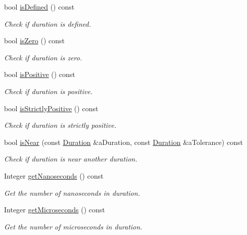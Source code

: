 \begin{DoxyCompactItemize}
bool \hyperlink{classlibrary_1_1physics_1_1time_1_1_duration_af6ee4c1644a1cafc96d670e576dc6749}{is\+Defined} () const
\begin{DoxyCompactList}\small\item\em Check if duration is defined. \end{DoxyCompactList}\item 
bool \hyperlink{classlibrary_1_1physics_1_1time_1_1_duration_a7f14980ea22f7e9cad122f7a37ba50be}{is\+Zero} () const
\begin{DoxyCompactList}\small\item\em Check if duration is zero. \end{DoxyCompactList}\item 
bool \hyperlink{classlibrary_1_1physics_1_1time_1_1_duration_a443d719fb2acf922cc80a8f2be441fa1}{is\+Positive} () const
\begin{DoxyCompactList}\small\item\em Check if duration is positive. \end{DoxyCompactList}\item 
bool \hyperlink{classlibrary_1_1physics_1_1time_1_1_duration_a2d4f7691e997232d4d9b88e7d4ab49d7}{is\+Strictly\+Positive} () const
\begin{DoxyCompactList}\small\item\em Check if duration is strictly positive. \end{DoxyCompactList}\item 
bool \hyperlink{classlibrary_1_1physics_1_1time_1_1_duration_a7df03d520e9372f58c37309e8ac8e08d}{is\+Near} (const \hyperlink{classlibrary_1_1physics_1_1time_1_1_duration}{Duration} \&a\+Duration, const \hyperlink{classlibrary_1_1physics_1_1time_1_1_duration}{Duration} \&a\+Tolerance) const
\begin{DoxyCompactList}\small\item\em Check if duration is near another duration. \end{DoxyCompactList}\item 
Integer \hyperlink{classlibrary_1_1physics_1_1time_1_1_duration_a5dad1e24c78cd7ef13a4220eb4e73dd0}{get\+Nanoseconds} () const
\begin{DoxyCompactList}\small\item\em Get the number of nanoseconds in duration. \end{DoxyCompactList}\item 
Integer \hyperlink{classlibrary_1_1physics_1_1time_1_1_duration_a65db73a28d87e3f06d307cbd688739a3}{get\+Microseconds} () const
\begin{DoxyCompactList}\small\item\em Get the number of microseconds in duration. \end{DoxyCompactList}\item 

\end{DoxyCompactItemize}
